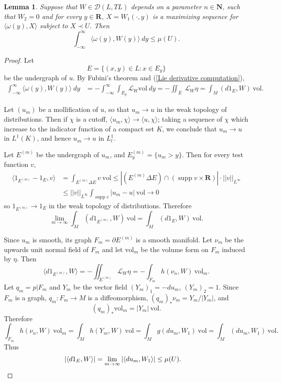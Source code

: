 \documentclass[reqno,12pt,letterpaper]{amsart}
\newcommand{\NN}{\mathbf{N}}
\newcommand{\RR}{\mathbf{R}}
\DeclareMathOperator{\supp}{supp}
\newcommand{\vol}{\mathrm{vol}}
\newtheorem{lemma}[theorem]{Lemma}
\theoremstyle{definition}
\numberwithin{equation}{section}
\begin{document}
\begin{lemma}\label{coarea converse}
Suppose that $W \in \mathcal D(L, TL)$ depends on a parameter $n \in \NN$, such that $W_2 = 0$ and for every $y \in \RR$, $X = W_1(\cdot, y)$ is a maximizing sequence for $\langle \omega(y), X\rangle$ subject to $X \prec U$.
Then
$$\int_{-\infty}^\infty \langle \omega(y), W(y)\rangle ~dy \leq \mu(U).$$
\end{lemma}
\begin{proof}
Let
$$E = \{(x, y) \in L: x \in E_y\}$$
be the undergraph of $u$.
By Fubini's theorem and (\ref{Lie derivative computation}),
\begin{align*}
\int_{-\infty}^\infty \langle \omega(y), W(y)\rangle ~dy &= -\int_{-\infty}^\infty \int_{E_y} \mathcal L_W\vol ~dy = -\iint_E ~\mathcal L_W\eta = \int_M (d1_E, W) ~\vol.
\end{align*}

Let $(u_m)$ be a mollification of $u$, so that $u_m \to u$ in the weak topology of distributions.
Then if $\chi$ is a cutoff, $\langle u_m, \chi\rangle \to \langle u, \chi\rangle$; taking a sequence of $\chi$ which increase to the indicator function of a compact set $K$, we conclude that $u_m \to u$ in $L^1(K)$, and hence $u_m \to u$ in $L^1_l$.

Let $E^{(m)}$ be the undergraph of $u_m$, and $E^{(m)}_y = \{u_m > y\}$.
Then for every test function $v$,
\begin{align*}
\langle 1_{E^{(m)}} - 1_E, v\rangle &= \int_{E^{(m)} \Delta E} v ~\vol \leq |(E^{(m)} \Delta E) \cap (\supp v \times \RR)| \cdot ||v||_{L^\infty}\\
&\leq ||v||_{L^\infty} \int_{\supp v} |u_m - u| ~\vol \to 0
\end{align*}
so $1_{E^{(m)}} \to 1_E$ in the weak topology of distributions.
Therefore
$$\lim_{m \to \infty} \int_M (d1_{E^{(m)}}, W) ~\vol = \int_M (d1_E, W) ~\vol.$$

Since $u_m$ is smooth, its graph $F_m = \partial E^{(m)}$ is a smooth manifold.
Let $\nu_m$ be the upwards unit normal field of $F_m$ and let $\vol_m$ be the volume form on $F_m$ induced by $\eta$.
Then
$$\langle d 1_{E^{(m)}}, W\rangle = -\iint_{E^{(m)}} \mathcal L_W\eta = -\int_{F_m} h(\nu_n, W) ~\vol_m.$$
Let $q_m = p|F_m$ and $Y_m$ be the vector field $(Y_m)_1 = -d u_m$, $(Y_m)_2 = 1$.
Since $F_m$ is a graph, $q_m: F_m \to M$ is a diffeomorphism, $(q_m)_*\nu_m = Y_m/|Y_m|$, and
$$(q_m)_* \vol_m = |Y_m| ~\vol.$$
Therefore
$$\int_{F_m} h(\nu_n, W) ~\vol_m = \int_M h(Y_m, W) ~\vol = \int_M g(d u_m, W_1) ~\vol = \int_M (d u_m, W_1) ~\vol.$$
Thus
\begin{align*}
|\langle d 1_E, W\rangle| &= \lim_{m \to \infty} |\langle d u_m, W_1\rangle| \leq \mu(U). \qedhere
\end{align*}
\end{proof}
\end{document}
